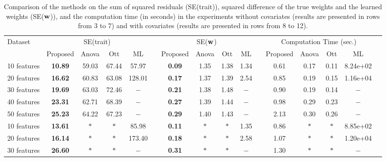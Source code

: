 \documentclass[10pt,letterpaper]{article}
\newcommand{\vect}[1]{\ensuremath\boldsymbol{\rm #1}}
\begin{document}
\begin{table}[!ht]
\begin{adjustwidth}{-2.25in}{0in} %
	\caption{Comparison of the methods on the sum of squared residuals (SE(trait)), squared difference of the true weights and the learned weights (SE($\vect w$)), and the computation time (in seconds) in the experiments without covariates (results are presented in rows from 3 to 7) and with covariates (results are presented in rows from 8 to 12).}
	\label{tbl:time-cost}
	\vskip 0.15in
	\begin{center}
		\begin{small}
			\setlength{\tabcolsep}{4pt}
			\begin{tabular}{lccccccccccccccc}
				\hline
				\multirow{2}{*}{Dataset}	 &  \multicolumn{4}{c}{SE(trait)}	 &     &\multicolumn{4}{c}{SE($\vect w$)}	 &     & \multicolumn{4}{c}{Computation Time (sec.)}        \\
				\cline{2-5} \cline{7-10} \cline{12-15}
				& Proposed & Anova & Ott & ML & & Proposed & Anova & Ott & ML & & Proposed & Anova & Ott & ML \\
				10 features & {\bf 10.89}	&	59.03	&	67.44	&	57.97	& &	{\bf 0.09}	&	1.35	&	1.38	&	1.34	& &	0.61	&	0.17	&	0.11	&	8.24e+02  \\
				20 features & {\bf 16.62}	&	60.83	&	63.08	&	128.01	& &	{\bf 0.17}	&	1.37	&	1.39	&	2.54	& &	0.85	&	0.19	&	0.15	&	1.16e+04  \\
				30 features & {\bf 19.69}	&	63.03	&	72.46	&	$-$	& &	{\bf 0.21}	&	1.38	&	1.48	&	$-$	& &	0.90	&	0.19	&	0.14	&	$-$  \\
				40 features & {\bf 23.31}	&	62.71	&	68.39	&	$-$	& &	{\bf 0.27}	&	1.39	&	1.44	&	$-$	& &	0.98	&	0.29	&	0.23	&	$-$  \\
				50 features & {\bf 25.23}	&	64.22	&	67.23	&	$-$	& &	{\bf 0.29}	&	1.40	&	1.43	&	$-$	& &	2.13	&	0.30	&	0.26	&	$-$\\ 
				\hline
				10 features	&{\bf 13.61}	& $*$ &	$*$ & 85.98	&	&	{\bf 0.11}	& $*$ &	$*$ &	1.35	&		&	0.86	&	$*$ & $*$ & 8.85e+02 \\
				20 features	&{\bf 16.14}	& $*$ &	$*$ &	173.40	&	&	{\bf 0.18}	& $*$ &	$*$ &	2.58	&		&	1.07	& $*$ &	$*$ &	1.20e+04  \\
				30 features	&{\bf 26.60}	& $*$ &	$*$ &	$-$	&		&	{\bf 0.31}	& $*$ &	$*$ &	$-$	&		&	1.30	& $*$ &	$*$ &	$-$  \\

\end{tabular}
\end{small}
\end{center}
\end{adjustwidth}
\end{table}
\end{document}
